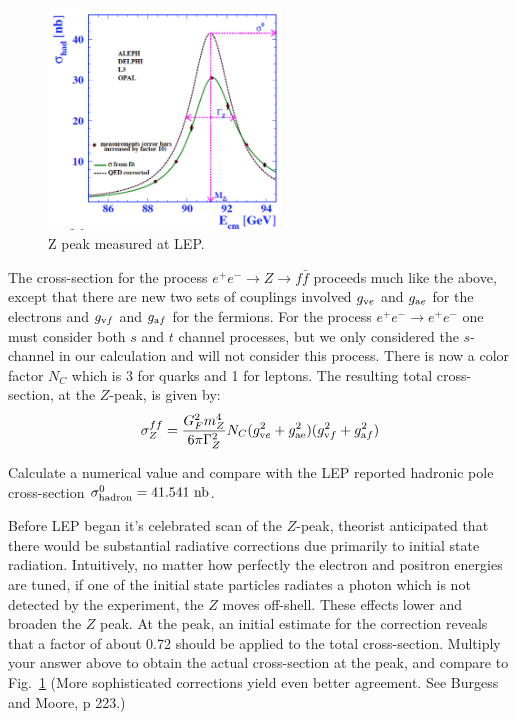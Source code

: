 \documentclass[12pt]{article}
\begin{document}
\begin{figure}[htbp]
\begin{center}
\includegraphics[width=0.55\textwidth]{figs/lep_zpeak.png}
\end{center}
\caption{\label{fig:lepzpeak} Z peak measured at LEP.}
\end{figure}

The cross-section for the process $e^+ e^- \to Z \to f \bar{f}$ proceeds much like the above, except that there are new two sets of couplings 
involved $g_{{\rm v}e}$ and $g_{{\rm a}e}$ for the electrons and $g_{{\rm v}f}$ and $g_{{\rm a}f}$ for the fermions.  For the process 
$e^+ e^- \to e^+ e^-$ one must consider both $s$ and $t$ channel processes, but we only considered the $s$-channel in our calculation and will not consider this process.  There is now a color factor $N_C$ which is 3 for quarks and 1 for leptons.  The resulting total cross-section, at the $Z$-peak, is given by:
\begin{equation}
\sigma_Z^{ff}  = \frac{G_F^2 m_Z^4}{6\pi\Gamma_Z^2}  N_C (g_{{\rm v}e}^2 + g_{\rm{a}e}^2) (g_{{\rm v}f}^2 + g_{{\rm a}f}^2)
\end{equation}

\begin{Exercise}
Calculate a numerical value and compare with the LEP reported hadronic pole cross-section $\sigma_{\rm hadron}^0=41.541~{\rm nb}$.


Before LEP began it's celebrated scan of the $Z$-peak, theorist anticipated that there would be substantial radiative corrections due primarily to initial state radiation.  Intuitively, no matter how perfectly the electron and positron energies are tuned, if one of the initial state particles radiates a photon which is not detected by the experiment, the $Z$ moves off-shell.  These effects lower and broaden the $Z$ peak.  At the peak, an initial estimate for the correction reveals that a factor of about 0.72 should be applied to the total cross-section.  Multiply your answer above to obtain the actual cross-section at the peak, and compare to Fig.~\ref{fig:lepzpeak} (More sophisticated corrections yield even better agreement.  See Burgess and Moore, p 223.)

\end{Exercise}
\end{document}

